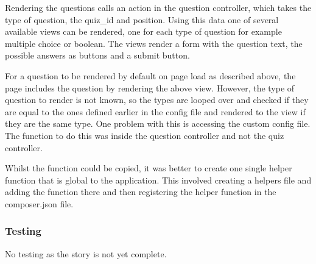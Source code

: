 Rendering the questions calls an action in the question controller, which takes the type of question, the quiz\_id and position. Using this data one of several available views can be rendered, one for each type of question for example multiple choice or boolean. The views render a form with the question text, the possible answers as buttons and a submit button.

For a question to be rendered by default on page load as described above, the page includes the question by rendering the above view. However, the type of question to render is not known, so the types are looped over and checked if they are equal to the ones defined earlier in the config file and rendered to the view if they are the same type. One problem with this is accessing the custom config file. The function to do this was inside the question controller and not the quiz controller. 

Whilst the function could be copied, it was better to create one single helper function that is global to the application. This involved creating a helpers file and adding the function there and then registering the helper function in the composer.json file\cite{laravel-helper-function}.

\subsubsection{Testing}
No testing as the story is not yet complete.
\newpage
